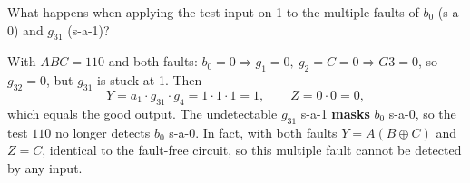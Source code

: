 \documentclass[a4paper, 10pt]{article}
\begin{document}
\begin{problem}
What happens when applying the test input on 1 to the multiple faults of \( b_0 \) (s-a-0) and \( g_{31} \) (s-a-1)?
\end{problem}

\begin{solution}
	\noindent With \( ABC=110 \) and both faults: \( b_0=0 \Rightarrow g_1=0,\ g_2=C=0 \Rightarrow G3=0 \),
	so \( g_{32}=0 \), but \( g_{31} \) is stuck at 1. Then
	\[ Y = a_1\cdot g_{31}\cdot g_4 = 1\cdot1\cdot1 = 1, \qquad Z = 0\cdot0=0, \]
	which equals the good output. The undetectable \( g_{31} \) s-a-1 \textbf{masks} \( b_0 \) s-a-0,
	so the test \( 110 \) no longer detects \( b_0 \) s-a-0. In fact, with both faults
	\( Y=A(B\oplus C) \) and \( Z=C \), identical to the fault-free circuit, so this multiple
	fault cannot be detected by any input.
\end{solution}
\end{document}
